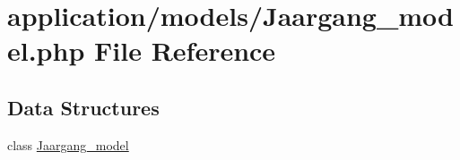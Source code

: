 \hypertarget{_jaargang__model_8php}{}\section{application/models/\+Jaargang\+\_\+model.php File Reference}
\label{_jaargang__model_8php}
\subsection*{Data Structures}
\begin{DoxyCompactItemize}
\item 
class \mbox{\hyperlink{class_jaargang__model}{Jaargang\+\_\+model}}
\end{DoxyCompactItemize}
